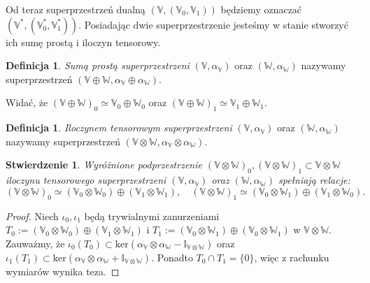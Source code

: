 \documentclass[11pt,a4paper]{report}
\newtheorem{proposition}[theorem]{Stwierdzenie}
\theoremstyle{definition}
\newtheorem{definition}[theorem]{Definicja}
\newcommand{\I}{\mathbb{I}}
\begin{document}
Od teraz superprzestrzeń dualną $(\mathbb{V},(\mathbb{V}_0, \mathbb{V}_1))$ będziemy oznaczać $(\mathbb{V}^{*},(\mathbb{V}_0^{*}, \mathbb{V}_1^{*}))$. Posiadając dwie superprzestrzenie jesteśmy w stanie stworzyć ich sumę prostą i iloczyn tensorowy.

\begin{definition}
\textit{Sumą prostą superprzestrzeni} $(\mathbb{V},\alpha_\mathbb{V})$ oraz $(\mathbb{W},\alpha_\mathbb{W})$ nazywamy superprzestrzeń $(\mathbb{V} \oplus \mathbb{W}, \alpha_\mathbb{V} \oplus \alpha_\mathbb{W}).$
\end{definition}

Widać, że $(\mathbb{V} \oplus \mathbb{W})_0 \simeq \mathbb{V}_0 \oplus \mathbb{W}_0$ oraz $(\mathbb{V} \oplus \mathbb{W})_1 \simeq \mathbb{V}_1 \oplus \mathbb{W}_1.$

\begin{definition}
\textit{Iloczynem tensorowym superprzestrzeni} $(\mathbb{V},\alpha_\mathbb{V})$ oraz $(\mathbb{W},\alpha_\mathbb{W})$ nazywamy superprzestrzeń $(\mathbb{V} \otimes \mathbb{W}, \alpha_\mathbb{V} \otimes \alpha_\mathbb{W}).$
\end{definition}

\begin{proposition}
\label{tensor_product_superspace_proposition}
Wyróżnione podprzestrzenie $(\mathbb{V} \otimes \mathbb{W})_0,(\mathbb{V} \otimes \mathbb{W})_1 \subset \mathbb{V} \otimes \mathbb{W}$ iloczynu tensorowego superprzestrzeni $(\mathbb{V},\alpha_\mathbb{V})$ oraz $(\mathbb{W},\alpha_\mathbb{W})$ spełniają relacje:
\begin{equation*}
(\mathbb{V} \otimes \mathbb{W})_0 \simeq (\mathbb{V}_0 \otimes \mathbb{W}_0) \oplus (\mathbb{V}_1 \otimes \mathbb{W}_1), \quad (\mathbb{V} \otimes \mathbb{W})_1 \simeq (\mathbb{V}_0 \otimes \mathbb{W}_1) \oplus (\mathbb{V}_1 \otimes \mathbb{W}_0).
\end{equation*}
\end{proposition}

\begin{proof}
Niech $\iota_0, \iota_1$ będą trywialnymi zanurzeniami $T_0 := (\mathbb{V}_0 \otimes \mathbb{W}_0) \oplus (\mathbb{V}_1 \otimes \mathbb{W}_1)$ i $T_1 := (\mathbb{V}_0 \otimes \mathbb{W}_1) \oplus (\mathbb{V}_0 \otimes \mathbb{W}_1)$ w $\mathbb{V} \otimes \mathbb{W}$. Zauważmy, że $\iota_0 (T_0) \subset \mathrm{ker}(\alpha_\mathbb{V} \otimes \alpha_\mathbb{W} - \I_{\mathbb{V}\otimes \mathbb{W}})$ oraz $\iota_1 (T_1) \subset \mathrm{ker}(\alpha_\mathbb{V} \otimes \alpha_\mathbb{W} + \I_{\mathbb{V}\otimes \mathbb{W}}).$ Ponadto $T_0 \cap T_1 = \{ 0 \}$, więc z rachunku wymiarów wynika teza.
\end{proof}
\end{document}
